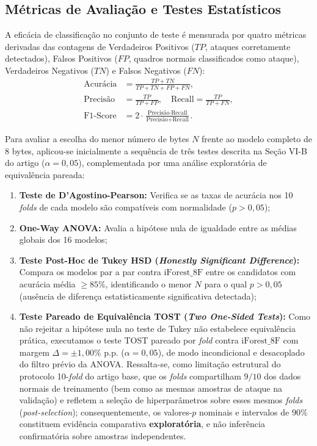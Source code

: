 \documentclass[conference]{IEEEtran}
\begin{document}
\subsection{Métricas de Avaliação e Testes Estatísticos}
A eficácia de classificação no conjunto de teste é mensurada por quatro métricas derivadas das contagens de Verdadeiros Positivos ($TP$, ataques corretamente detectados), Falsos Positivos ($FP$, quadros normais classificados como ataque), Verdadeiros Negativos ($TN$) e Falsos Negativos ($FN$):
\begin{align}
\text{Acurácia} &= \frac{TP + TN}{TP + TN + FP + FN}, \label{eq:acc} \\
\text{Precisão} &= \frac{TP}{TP + FP}, \quad \text{Recall} = \frac{TP}{TP + FN}, \label{eq:prec_rec} \\
\text{F1-Score} &= 2 \cdot \frac{\text{Precisão} \cdot \text{Recall}}{\text{Precisão} + \text{Recall}}. \label{eq:f1}
\end{align}

Para avaliar a escolha do menor número de bytes $N$ frente ao modelo completo de 8 bytes, aplicou-se inicialmente a sequência de três testes descrita na Seção VI-B do artigo ($\alpha = 0{,}05$), complementada por uma análise exploratória de equivalência pareada:
\begin{enumerate}
    \item \textbf{Teste de D'Agostino-Pearson:} Verifica se as taxas de acurácia nos 10 \textit{folds} de cada modelo são compatíveis com normalidade ($p > 0{,}05$);
    \item \textbf{One-Way ANOVA:} Avalia a hipótese nula de igualdade entre as médias globais dos 16 modelos;
    \item \textbf{Teste Post-Hoc de Tukey HSD (\textit{Honestly Significant Difference}):} Compara os modelos par a par contra $\text{iForest\_8F}$ entre os candidatos com acurácia média $\ge 85\%$, identificando o menor $N$ para o qual $p > 0{,}05$ (ausência de diferença estatisticamente significativa detectada);
    \item \textbf{Teste Pareado de Equivalência TOST (\textit{Two One-Sided Tests}):} Como não rejeitar a hipótese nula no teste de Tukey não estabelece equivalência prática, executamos o teste TOST pareado por \textit{fold} contra $\text{iForest\_8F}$ com margem $\Delta = \pm 1{,}00\%$ p.p. ($\alpha = 0{,}05$), de modo incondicional e desacoplado do filtro prévio da ANOVA. Ressalta-se, como limitação estrutural do protocolo 10-\textit{fold} do artigo base, que os \textit{folds} compartilham $9/10$ dos dados normais de treinamento (bem como as mesmas amostras de ataque na validação) e refletem a seleção de hiperparâmetros sobre esses mesmos \textit{folds} (\textit{post-selection}); consequentemente, os valores-$p$ nominais e intervalos de $90\%$ constituem evidência comparativa \textbf{exploratória}, e não inferência confirmatória sobre amostras independentes.
\end{enumerate}
\end{document}
